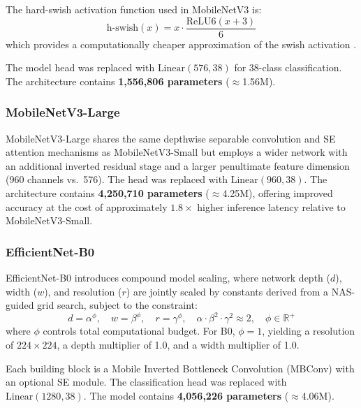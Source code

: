 \documentclass[pdflatex,sn-mathphys-num]{sn-jnl}
\theoremstyle{thmstyleone}%
\theoremstyle{thmstyletwo}%
\theoremstyle{thmstylethree}%
\begin{document}
The hard-swish activation function used in MobileNetV3 is:
\begin{equation}
  \text{h-swish}(x) = x \cdot \frac{\text{ReLU6}(x + 3)}{6}
  \label{eq:hswish}
\end{equation}
which provides a computationally cheaper approximation of the swish activation
\citep{howard2019mobilenetv3}.

The model head was replaced with $\text{Linear}(576, 38)$ for 38-class classification.
The architecture contains \textbf{1{,}556{,}806 parameters} ($\approx$1.56M).

\subsubsection{MobileNetV3-Large}

MobileNetV3-Large \citep{howard2019mobilenetv3} shares the same depthwise separable
convolution and SE attention mechanisms as MobileNetV3-Small but employs a wider
network with an additional inverted residual stage and a larger penultimate feature
dimension (960 channels vs.\ 576). The head was replaced with $\text{Linear}(960, 38)$.
The architecture contains \textbf{4{,}250{,}710 parameters} ($\approx$4.25M), offering
improved accuracy at the cost of approximately $1.8\times$ higher inference latency
relative to MobileNetV3-Small.

\subsubsection{EfficientNet-B0}

EfficientNet-B0 \citep{tan2019efficientnet} introduces compound model scaling, where
network depth ($d$), width ($w$), and resolution ($r$) are jointly scaled by constants
derived from a NAS-guided grid search, subject to the constraint:
\begin{equation}
  d = \alpha^\phi, \quad w = \beta^\phi, \quad r = \gamma^\phi, \quad
  \alpha \cdot \beta^2 \cdot \gamma^2 \approx 2, \quad \phi \in \mathbb{R}^+
  \label{eq:compound_scaling}
\end{equation}
where $\phi$ controls total computational budget. For B0, $\phi = 1$, yielding a
resolution of $224\times224$, a depth multiplier of 1.0, and a width multiplier of 1.0.

Each building block is a Mobile Inverted Bottleneck Convolution (MBConv) with an
optional SE module. The classification head was replaced with
$\text{Linear}(1280, 38)$. The model contains \textbf{4{,}056{,}226 parameters}
($\approx$4.06M).
\end{document}
